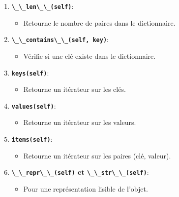 \documentclass[12pt,a4paper]{report}
\newcommand{\passthrough}[1]{#1}
\providecommand{\tightlist}{%
  \setlength{\itemsep}{0pt}\setlength{\parskip}{0pt}}
\begin{document}
\begin{enumerate}
  \begin{itemize}
  \tightlist
  \item
    Permet de supprimer une paire par sa clé :
    \passthrough{\lstinline!del idict[key]!}.
  \item
    Lève une \passthrough{\lstinline!KeyError!} si la clé n'existe pas.
  \item
    Doit supprimer l'entrée des deux dictionnaires internes.
  \end{itemize}
\item
  \textbf{\passthrough{\lstinline!\_\_len\_\_(self)!}}:

  \begin{itemize}
  \tightlist
  \item
    Retourne le nombre de paires dans le dictionnaire.
  \end{itemize}
\item
  \textbf{\passthrough{\lstinline!\_\_contains\_\_(self, key)!}}:

  \begin{itemize}
  \tightlist
  \item
    Vérifie si une clé existe dans le dictionnaire.
  \end{itemize}
\item
  \textbf{\passthrough{\lstinline!keys(self)!}}:

  \begin{itemize}
  \tightlist
  \item
    Retourne un itérateur sur les clés.
  \end{itemize}
\item
  \textbf{\passthrough{\lstinline!values(self)!}}:

  \begin{itemize}
  \tightlist
  \item
    Retourne un itérateur sur les valeurs.
  \end{itemize}
\item
  \textbf{\passthrough{\lstinline!items(self)!}}:

  \begin{itemize}
  \tightlist
  \item
    Retourne un itérateur sur les paires (clé, valeur).
  \end{itemize}
\item
  \textbf{\passthrough{\lstinline!\_\_repr\_\_(self)!} et
  \passthrough{\lstinline!\_\_str\_\_(self)!}}:

  \begin{itemize}
  \tightlist
  \item
    Pour une représentation lisible de l'objet.
  \end{itemize}
\end{enumerate}
\end{document}
